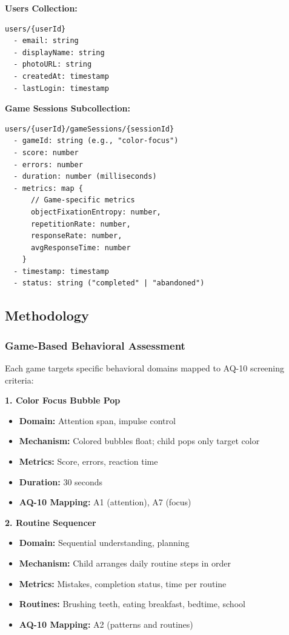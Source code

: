 \documentclass[12pt,letterpaper]{article}
\begin{document}
\textbf{Users Collection:}
\begin{verbatim}
users/{userId}
  - email: string
  - displayName: string
  - photoURL: string
  - createdAt: timestamp
  - lastLogin: timestamp
\end{verbatim}

\textbf{Game Sessions Subcollection:}
\begin{verbatim}
users/{userId}/gameSessions/{sessionId}
  - gameId: string (e.g., "color-focus")
  - score: number
  - errors: number
  - duration: number (milliseconds)
  - metrics: map {
      // Game-specific metrics
      objectFixationEntropy: number,
      repetitionRate: number,
      responseRate: number,
      avgResponseTime: number
    }
  - timestamp: timestamp
  - status: string ("completed" | "abandoned")
\end{verbatim}

\subsection{Methodology}

\subsubsection{Game-Based Behavioral Assessment}

Each game targets specific behavioral domains mapped to AQ-10 screening criteria:

\textbf{1. Color Focus Bubble Pop}
\begin{itemize}
    \item \textbf{Domain:} Attention span, impulse control
    \item \textbf{Mechanism:} Colored bubbles float; child pops only target color
    \item \textbf{Metrics:} Score, errors, reaction time
    \item \textbf{Duration:} 30 seconds
    \item \textbf{AQ-10 Mapping:} A1 (attention), A7 (focus)
\end{itemize}

\textbf{2. Routine Sequencer}
\begin{itemize}
    \item \textbf{Domain:} Sequential understanding, planning
    \item \textbf{Mechanism:} Child arranges daily routine steps in order
    \item \textbf{Metrics:} Mistakes, completion status, time per routine
    \item \textbf{Routines:} Brushing teeth, eating breakfast, bedtime, school
    \item \textbf{AQ-10 Mapping:} A2 (patterns and routines)
\end{itemize}
\end{document}
